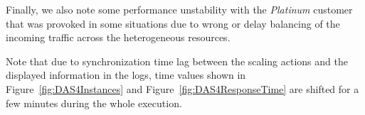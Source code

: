Finally, we also note some performance unstability with the \emph{Platinum} customer that was provoked in some situations due to wrong or delay balancing of the incoming traffic across the heterogeneous resources.

Note that due to synchronization time lag between the scaling actions and the displayed information in the logs, time values shown in Figure~\ref{fig:DAS4Instances} and Figure~\ref{fig:DAS4ResponseTime} are shifted for a few minutes during the whole execution.

